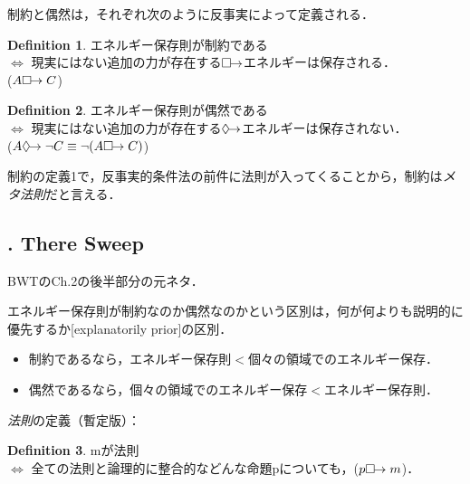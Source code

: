 \documentclass[dvipdfmx,twoside,11pt,uplatex]{jsarticle}
\theoremstyle{definition}
\newtheorem{dfn}{Definition}
\begin{document}

制約と偶然は，それぞれ次のように反事実によって定義される．
\begin{dfn}
エネルギー保存則が制約である\\
$\Longleftrightarrow$
現実にはない追加の力が存在する$\Box\hspace{-4pt}\rightarrow$エネルギーは保存される．\\
($A\Box\hspace{-4pt}\rightarrow C$)
\end{dfn}
\begin{dfn}
エネルギー保存則が偶然である\\
$\Longleftrightarrow$
現実にはない追加の力が存在する$\Diamond\hspace{-4pt}\rightarrow$エネルギーは保存されない．\\
($A\Diamond\hspace{-4pt}\rightarrow\lnot C\equiv \lnot(A\Box\hspace{-4pt}\rightarrow C)$)
\end{dfn}
制約の定義1で，反事実的条件法の前件に法則が入ってくることから，制約は\emph{メタ法則}だと言える\citep[170]{Lange2012}．

\subsection{\cite{Lange2012}. There Sweep}
BWTのCh.2の後半部分の元ネタ．

エネルギー保存則が制約なのか偶然なのかという区別は，何が何よりも説明的に優先するか[explanatorily prior]の区別\citep[157]{Lange2012}．
\begin{itemize}
	\item 制約であるなら，エネルギー保存則$<$個々の領域でのエネルギー保存．
	\item 偶然であるなら，個々の領域でのエネルギー保存$<$エネルギー保存則．
\end{itemize}

\emph{法則}の定義（暫定版）\citep[171--2]{Lange2012}：
\begin{dfn}
mが法則\\
$\Longleftrightarrow$ 全ての法則と論理的に整合的などんな命題pについても，($p\Box\hspace{-4pt}\rightarrow m$)．
\end{dfn}
\end{document}

